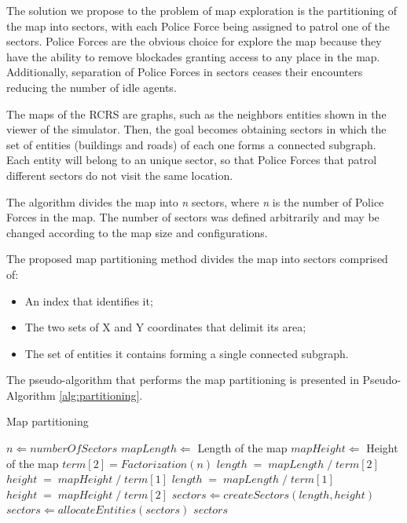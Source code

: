 The solution we propose to the problem of map exploration is the partitioning of the map into sectors, with each Police Force being assigned to patrol one of the sectors. Police Forces are the obvious choice for explore the map because they have the ability to remove blockades granting access to any place in the map. Additionally, separation of Police Forces in sectors ceases their encounters reducing the number of idle agents.

The maps of the RCRS are graphs, such as the neighbors entities shown in the viewer of the simulator. Then, the goal becomes obtaining sectors in which the set of entities (buildings and roads) of each one forms a connected subgraph. Each entity will belong to an unique sector, so that Police Forces that patrol different sectors do not visit the same location.

The algorithm divides the map into {\it n} sectors, where {\it n} is the number of Police Forces in the map. The number of sectors was defined arbitrarily and may be changed according to the map size and configurations.

The proposed map partitioning method divides the map into sectors comprised of:
\begin{itemize}
\item An index that identifies it;
\item The two sets of X and Y coordinates that delimit its area;
\item The set of entities it contains forming a single connected subgraph.
\end{itemize}

The pseudo-algorithm that performs the map partitioning is presented in Pseudo-Algorithm \ref{alg:partitioning}.
\begin{algorithm}
  \caption{Map partitioning}
  \label{alg:partitioning}
  \begin{algorithmic}
    \REQUIRE $n \Leftarrow numberOfSectors$
    \STATE
    \STATE $mapLength \Leftarrow$ Length of the map
    \STATE $mapHeight \Leftarrow$ Height of the map
    \STATE $term[2] = Factorization(n)$ 
      \STATE $length\;=\;mapLength\;/\;term[2]$
      \STATE $height\;=\;mapHeight\;/\;term[1]$
    \ELSE
      \STATE $length\;=\;mapLength\;/\;term[1]$
      \STATE $height\;=\;mapHeight\;/\;term[2]$
    \ENDIF
    \STATE $sectors \Leftarrow createSectors(length, height)$
    \STATE $sectors \Leftarrow allocateEntities(sectors)$
    \RETURN $sectors$
  \end{algorithmic}
\end{algorithm}

